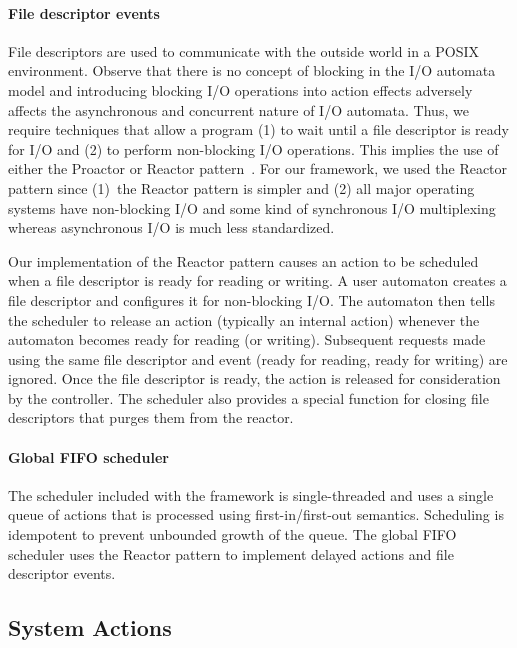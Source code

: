 \paragraph*{File descriptor events}
File descriptors are used to communicate with the outside world in a POSIX environment.
Observe that there is no concept of blocking in the I/O automata model and introducing blocking I/O operations into action effects adversely affects the asynchronous and concurrent nature of I/O automata.
Thus, we require techniques that allow a program (1) to wait until a file descriptor is ready for I/O and (2) to perform non-blocking I/O operations.
This implies the use of either the Proactor or Reactor pattern~\cite{schmidt2000pattern}.
For our framework, we used the Reactor pattern since (1)~the Reactor pattern is simpler and (2) all major operating systems have non-blocking I/O and some kind of synchronous I/O multiplexing whereas asynchronous I/O is much less standardized.

Our implementation of the Reactor pattern causes an action to be scheduled when a file descriptor is ready for reading or writing.
A user automaton creates a file descriptor and configures it for non-blocking I/O.
The automaton then tells the scheduler to release an action (typically an internal action) whenever the automaton becomes ready for reading (or writing).
Subsequent requests made using the same file descriptor and event (ready for reading, ready for writing) are ignored.
Once the file descriptor is ready, the action is released for consideration by the controller.
The scheduler also provides a special function for closing file descriptors that purges them from the reactor.

\paragraph*{Global FIFO scheduler}
The scheduler included with the framework is single-threaded and uses a single queue of actions that is processed using first-in/first-out semantics.
Scheduling is idempotent to prevent unbounded growth of the queue.
The global FIFO scheduler uses the Reactor pattern to implement delayed actions and file descriptor events.

\subsection{System Actions\label{system_action_section}}

